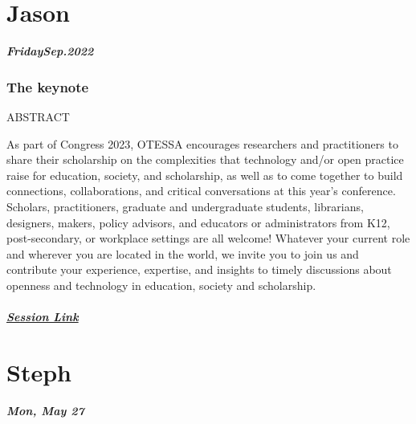 \documentclass[
]{book}
\begin{document}
\hypertarget{jason}{%
\section*{Jason}\label{jason}}

\textbf{\emph{FridaySep.2022}}

\begin{keynote}
\hypertarget{the-keynote}{%
\subsubsection{The keynote}\label{the-keynote}}

ABSTRACT

As part of Congress 2023, OTESSA encourages researchers and
practitioners to share their scholarship on the complexities that
technology and/or open practice raise for education, society, and
scholarship, as well as to come together to build connections,
collaborations, and critical conversations at this year's conference.
Scholars, practitioners, graduate and undergraduate students,
librarians, designers, makers, policy advisors, and educators or
administrators from K12, post-secondary, or workplace settings are all
welcome! Whatever your current role and wherever you are located in the
world, we invite you to join us and contribute your experience,
expertise, and insights to timely discussions about openness and
technology in education, society and scholarship.

\hypertarget{session-link}{%
\subparagraph{\texorpdfstring{\href{}{Session
Link}}{Session Link}}\label{session-link}}
\end{keynote}

\hypertarget{steph}{%
\section*{Steph}\label{steph}}

\textbf{\emph{Mon, May 27}}
\end{document}
